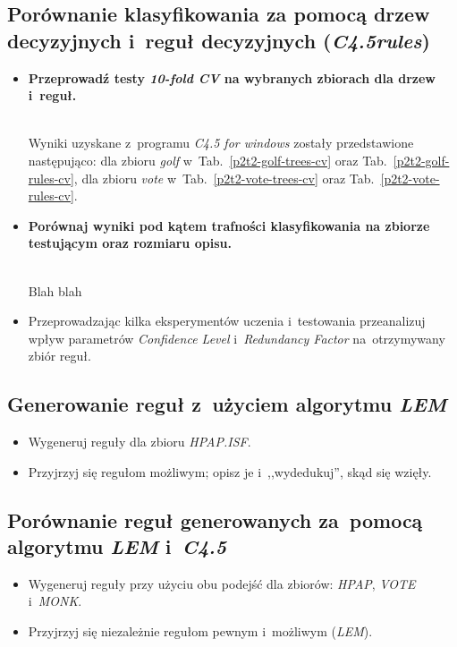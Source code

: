 \subsection{Porównanie klasyfikowania za pomocą drzew decyzyjnych i~reguł decyzyjnych (\emph{C4.5rules})}
\begin{itemize}
\item \textbf{Przeprowadź testy \emph{10-fold CV} na wybranych zbiorach dla drzew i~reguł.}






	\\Wyniki uzyskane z~programu \emph{C4.5 for windows} zostały przedstawione następująco: dla zbioru \emph{golf} w~Tab.~\ref{p2t2-golf-trees-cv} oraz Tab.~\ref{p2t2-golf-rules-cv}, dla zbioru \emph{vote} w~Tab.~\ref{p2t2-vote-trees-cv} oraz Tab.~\ref{p2t2-vote-rules-cv}.

\item \textbf{Porównaj wyniki pod kątem trafności klasyfikowania na zbiorze testującym oraz rozmiaru opisu.}
	
	
	\\Blah blah
	
\item Przeprowadzając kilka eksperymentów uczenia i~testowania przeanalizuj wpływ parametrów \emph{Confidence Level} i~\emph{Redundancy Factor} na~otrzymywany zbiór reguł.
\end{itemize}

\subsection{Generowanie reguł z~użyciem algorytmu \emph{LEM}}

\begin{itemize}
\item Wygeneruj reguły dla zbioru \emph{HPAP.ISF}.
\item Przyjrzyj się regułom możliwym; opisz je i~,,wydedukuj'', skąd się wzięły.
\end{itemize}

\subsection{Porównanie reguł generowanych za~pomocą algorytmu \emph{LEM} i~\emph{C4.5}}

\begin{itemize}
\item Wygeneruj reguły przy użyciu obu podejść dla zbiorów: \emph{HPAP}, \emph{VOTE} i~\emph{MONK}.
\item Przyjrzyj się niezależnie regułom pewnym i~możliwym (\emph{LEM}).
\end{itemize}

